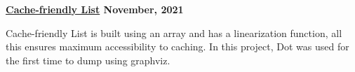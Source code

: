 \textbf{\href{https://github.com/jirol9xa/list} {Cache-friendly List} \hfill November, 2021}\par

\begin{itemize}
    Cache-friendly List is built using an array and has a linearization function, all this ensures maximum accessibility to caching. In this project, Dot was used for the first time to dump using graphviz.
\end{itemize}\par